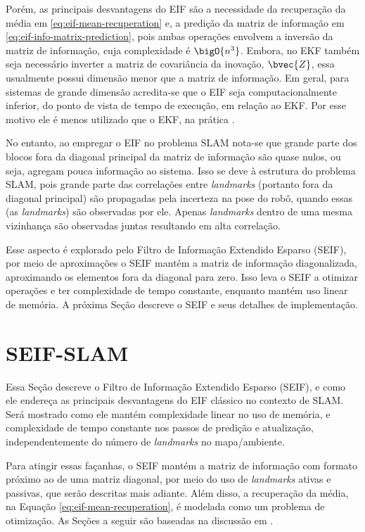Porém, as principais desvantagens do EIF são a necessidade da recuperação da média em \ref{eq:eif-mean-recuperation} e, a predição da matriz de informação em 
\ref{eq:eif-info-matrix-prediction}, pois ambas operações envolvem a inversão 
da matriz de informação, cuja complexidade é $\bigO{n^3}$. Embora, no EKF 
também seja 
necessário inverter a matriz de covariância da inovação, $\bvec{Z}$, 
essa usualmente possui dimensão menor que a matriz de informação. 
Em geral, para sistemas de grande dimensão acredita-se que o EIF seja 
computacionalmente inferior, do ponto de vista de tempo de execução, em relação 
ao EKF. Por esse motivo ele é menos utilizado que o EKF, na prática 
\cite[p.~78]{bongard2006probabilistic}.

No entanto, ao empregar o EIF no problema SLAM nota-se que grande parte dos 
blocos fora da diagonal principal da matriz de informação são quase nulos, ou 
seja, agregam pouca informação ao sistema. Isso se deve à estrutura do problema 
SLAM, pois grande parte das correlações entre \textit{landmarks} (portanto 
fora da diagonal principal) são propagadas pela incerteza na pose do robô, 
quando essas (as \textit{landmarks}) são observadas por ele. Apenas 
\textit{landmarks} dentro de uma mesma vizinhança são observadas juntas 
resultando em alta correlação.

Esse aspecto é explorado pelo Filtro de Informação Extendido Esparso (SEIF), 
por meio de aproximações o SEIF mantém a matriz de informação diagonalizada, 
aproximando os elementos fora da diagonal para zero. Isso leva o SEIF a otimizar 
operações e ter complexidade de tempo constante, enquanto mantém uso linear de 
memória. A próxima Seção descreve o SEIF e seus detalhes de implementação.

\section{SEIF-SLAM}
Essa Seção descreve o Filtro de Informação Extendido Esparso (SEIF), e 
como ele endereça as principais desvantagens do EIF clássico no 
contexto de SLAM. Será mostrado como ele mantém complexidade 
linear no uso de memória, e complexidade de tempo constante nos passos de predição e atualização, independentemente do número de 
\textit{landmarks} no mapa/ambiente.

Para atingir essas façanhas, o SEIF mantém a matriz de informação 
com formato próximo ao de uma matriz diagonal, por meio do uso de 
\textit{landmarks} ativas e passivas, que serão descritas mais adiante. 
Além disso, a recuperação da média, na Equação 
\ref{eq:eif-mean-recuperation}, é modelada como um problema de 
otimização. As Seções a seguir são baseadas na discussão em \cite[Capítulo~12.4]{bongard2006probabilistic}.

